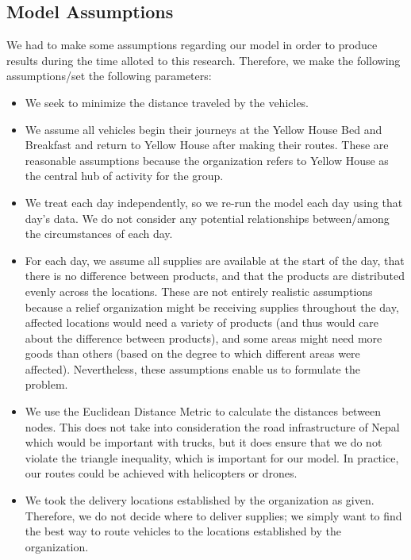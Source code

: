 \documentclass[11pt]{article}
\begin{document}
\subsection{Model Assumptions}

We had to make some assumptions regarding our model in order to produce results during the time alloted to this research.  Therefore, we make the following assumptions/set the following parameters:

\begin{itemize}

\item We seek to minimize the distance traveled by the vehicles.
    
\item We assume all vehicles begin their journeys at the Yellow House Bed and Breakfast and return to Yellow House after making their routes.  These are reasonable assumptions because the organization refers to Yellow House as the central hub of activity for the group.
    
\item We treat each day independently, so we re-run the model each day using that day's data.  We do not consider any potential relationships between/among the circumstances of each day. 

\item For each day, we assume all supplies are available at the start of the day, that there is no difference between products, and that the products are distributed evenly across the locations.  These are not entirely realistic assumptions because a relief organization might be receiving supplies throughout the day, affected locations would need a variety of products (and thus would care about the difference between products), and some areas might need more goods than others (based on the degree to which different areas were affected).  Nevertheless, these assumptions enable us to formulate the problem.
    
\item We use the Euclidean Distance Metric to calculate the distances between nodes.  This does not take into consideration the road infrastructure of Nepal which would be important with trucks, but it does ensure that we do not violate the triangle inequality, which is important for our model.  In practice, our routes could be achieved with helicopters or drones.
    
\item We took the delivery locations established by the organization as given.  Therefore, we do not decide where to deliver supplies; we simply want to find the best way to route vehicles to the locations established by the organization.

\end{itemize}
\end{document}

